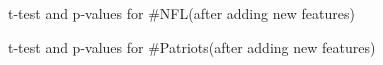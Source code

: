 \documentclass{article}
\begin{document}
\begin{figure}
\centering
{}
\caption{t-test and p-values for \#NFL(after adding new features)} \label{Q4_3}
\end{figure}

\begin{figure}
\centering
{}
\caption{t-test and p-values for \#Patriots(after adding new features)} \label{Q4_4}
\end{figure}
\end{document}
